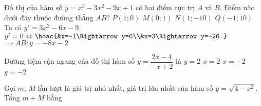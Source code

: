 \begin{ex}%
	Đồ thị của hàm số $y=x^3-3x^2-9x+1$ có hai điểm cực trị $A$ và $B$. Điểm nào dưới đây thuộc đường thẳng $AB$?
	\choice
	{$P (1;0)$}
	{$M (0;1)$}
	{\True $N(1;-10)$}
	{$Q (-1;10)$}
	\loigiai
	{
		Ta có $y'=3x^2-6x-9$.\\
		$y'=0\Leftrightarrow\hoac{&x=-1\Rightarrow y=6\\&x=3\Rightarrow y=-26.}$\\
		$\Rightarrow AB: y=-8x-2$
	}
\end{ex}

\begin{ex}%
	Đường tiệm cận ngang của đồ thị hàm số $y=\dfrac{2x-4}{-x+2}$ là
	\choice
	{ $y=2$}
	{ $x=2$}
	{$x=-2$}
	{\True$y=-2$}
\end{ex}

\begin{ex}%
	Gọi $m$, $M$ lần lượt là giá trị nhỏ nhất, giá trị lớn nhất của hàm số $y=\sqrt{4-x^2}$. Tổng $m+M$ bằng
\end{ex}

